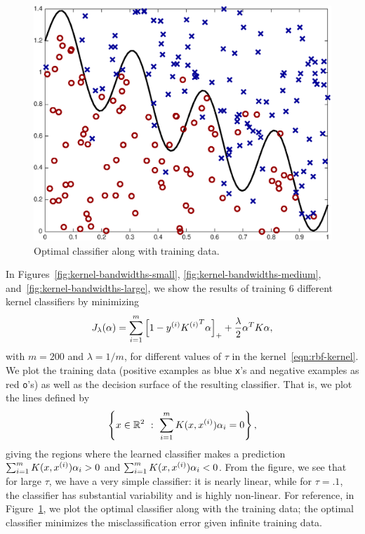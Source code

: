 \documentclass{article}
\begin{document}
\begin{figure}[ht]
  \begin{center}
    \includegraphics[width=.6\columnwidth]{true_class.eps}
    \caption{\label{fig:true-classifier} Optimal classifier along
      with training data.}
  \end{center}
\end{figure}

In Figures~\ref{fig:kernel-bandwidths-small}, \ref{fig:kernel-bandwidths-medium},
and~\ref{fig:kernel-bandwidths-large},
we show the results of training
$6$ different kernel classifiers by minimizing
\begin{equation*}
  J_\lambda(\alpha) = \sum_{i = 1}^m \left[{1 - {y^{(i)}}{K^{(i)}}^T \alpha}\right]_+
  + \frac{\lambda}{2} \alpha^T K \alpha,
\end{equation*}
with $m = 200$ and $\lambda = 1/m$, for different values
of $\tau$ in the kernel~\eqref{eqn:rbf-kernel}. We plot the
training data (positive examples as blue \texttt{x}'s and
negative examples as red \texttt{o}'s) as well as the decision surface
of the resulting classifier. That is, we plot the lines defined by
\begin{equation*}
  \left\{x \in \mathbb{R}^2 ~ : ~ \sum_{i = 1}^m K(x, {x^{(i)}}) \alpha_i = 0 \right\},
\end{equation*}
giving the regions where the learned classifier makes a prediction $\sum_{i
  = 1}^m K(x, {x^{(i)}}) \alpha_i > 0$ and $\sum_{i = 1}^m K(x, {x^{(i)}}) \alpha_i <
0$. From the figure, we see that for large $\tau$, we have a very simple
classifier: it is nearly linear, while for $\tau = .1$, the classifier has
substantial variability and is highly non-linear.
For reference, in Figure~\ref{fig:true-classifier}, we plot the
optimal classifier along with the training data; the optimal classifier
minimizes the misclassification error given infinite training data.

\appendix
\end{document}
